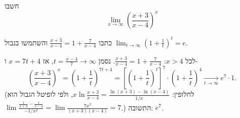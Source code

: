 
\begin{question}
חשבו
\[ \lim_{x\longrightarrow\infty}\left(\frac{x+3}{x-4}\right)^x \]
\end{question}

\begin{hint}
כתבו $\frac{x+3}{x-4}=1+\frac{7}{x-4}$ והשתמשו בגבול $\lim_{t\to\infty}\left(1+\frac1t\right)^t=e$.
\end{hint}

\begin{solution}
לכל $x>4$: $\frac{x+3}{x-4}=1+\frac{7}{x-4}$. נסמן $t=\frac{x-4}{7}\to\infty$, אז $x=7t+4$ ו-
\[ \left(\frac{x+3}{x-4}\right)^x=\left(1+\frac1t\right)^{7t+4}=\left[\left(1+\frac1t\right)^{t}\right]^7\cdot\left(1+\frac1t\right)^4\xrightarrow[t\to\infty]{}e^7\cdot1. \]
(לחלופין: $x\ln\frac{x+3}{x-4}=\frac{\ln(x+3)-\ln(x-4)}{1/x}$, ולפי לופיטל הגבול הוא $\lim\frac{\frac1{x+3}-\frac1{x-4}}{-1/x^2}=\lim\frac{7x^2}{(x+3)(x-4)}=7$.)
התשובה: $\boxed{e^7}$.
\end{solution}
